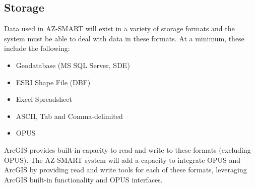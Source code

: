 \subsection{Storage}
Data used in AZ-SMART will exist in a variety of storage formats and
the system must be able to deal with data in these formats.  At a
minimum, these include the following:

\begin{itemize}
\item Geodatabase (MS SQL Server, SDE)
\item ESRI Shape File (DBF)
\item Excel Spreadsheet
\item ASCII, Tab and Comma-delimited
\item OPUS
\end{itemize}

ArcGIS provides built-in capacity to read and write to these formats
(excluding OPUS).  The AZ-SMART system will add a capacity to integrate
OPUS and ArcGIS by providing read and write tools for each of these
formats, leveraging ArcGIS built-in functionality and OPUS interfaces.
